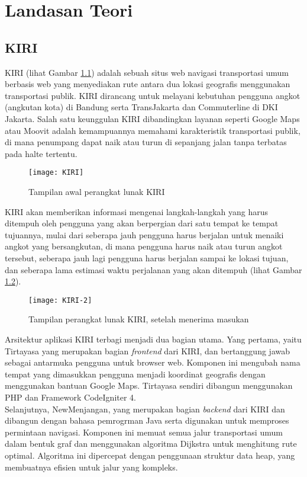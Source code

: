 \chapter{Landasan Teori}
\label{chap:teori}

\section{KIRI}
\label{sec:kiri}
KIRI (lihat Gambar \ref{fig:tampilanawalkiri}) adalah sebuah situs web navigasi transportasi umum berbasis web yang menyediakan rute antara dua lokasi geografis menggunakan transportasi publik. KIRI dirancang untuk melayani kebutuhan pengguna angkot (angkutan kota) di Bandung serta TransJakarta dan Commuterline di DKI Jakarta. Salah satu keunggulan KIRI dibandingkan layanan seperti Google Maps atau Moovit adalah kemampuannya memahami karakteristik  transportasi publik, di mana penumpang dapat naik atau turun di sepanjang jalan tanpa terbatas pada halte tertentu.
\begin{figure}[H] 
	\centering  
	\texttt{[image: KIRI]}  
	\caption{Tampilan awal perangkat lunak KIRI}
	\label{fig:tampilanawalkiri} 
\end{figure}
\newpage
\noindent
KIRI akan memberikan informasi mengenai langkah-langkah yang harus ditempuh oleh pengguna yang akan berpergian dari satu tempat ke tempat tujuannya, mulai dari seberapa jauh pengguna harus berjalan untuk menaiki angkot yang bersangkutan, di mana pengguna harus naik atau turun angkot tersebut, seberapa jauh lagi pengguna harus berjalan sampai ke lokasi tujuan, dan seberapa lama estimasi waktu perjalanan yang akan ditempuh (lihat Gambar \ref{fig:tampilankiri}).
\begin{figure}[H] 
	\centering  
	\texttt{[image: KIRI-2]}  
	\caption{Tampilan perangkat lunak KIRI, setelah menerima masukan}
	\label{fig:tampilankiri} 
\end{figure}
\noindent
Arsitektur aplikasi KIRI terbagi menjadi dua bagian utama. Yang pertama, yaitu Tirtayasa yang merupakan bagian \textit{frontend} dari KIRI, dan bertanggung jawab sebagai antarmuka pengguna untuk browser web. Komponen ini mengubah nama tempat yang dimasukkan pengguna menjadi koordinat geografis dengan menggunakan bantuan Google Maps. Tirtayasa sendiri dibangun menggunakan PHP dan Framework CodeIgniter 4.
\\
Selanjutnya, NewMenjangan, yang merupakan bagian \textit{backend} dari KIRI dan dibangun dengan bahasa pemrogrman Java serta digunakan untuk memproses permintaan navigasi. Komponen ini memuat semua jalur transportasi umum dalam bentuk graf dan menggunakan algoritma Dijkstra untuk menghitung rute optimal. Algoritma ini dipercepat dengan penggunaan struktur data heap, yang membuatnya efisien untuk jalur yang kompleks.


